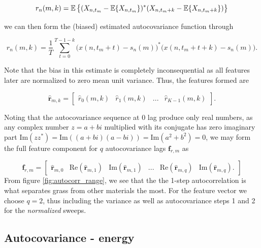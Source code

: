 \begin{equation}
	r_n(m, k) = \operatorname*{\mathbb{E}}\big\{(X_{n,t_m} - \operatorname*{\mathbb{E}}\{X_{n,t_m}\})^*(X_{n,t_m+k} - \operatorname*{\mathbb{E}}\{X_{n,t_m+k}\})\big\}
\end{equation}

\noindent
we can then form the (biased) estimated autocovariance function through

\begin{equation}
	\hat{r}_n(m, k) = \frac{1}{T}\sum_{t=0}^{T-1-k}\big(x(n,t_m+t) - s_n(m)\big)^*\big(x(n,t_m+t+k) - s_n(m)\big).
\end{equation}


Note that the bias in this estimate is completely inconsequential as all features later are normalized to zero mean unit variance.  Thus, the features formed are

\begin{equation}
	\hat{\mathbf{r}}_{m,k} = 
	\begin{bmatrix}
		\hat{r}_0(m,k) & \hat{r}_1(m,k) & ... & \hat{r}_{K-1}(m,k)
	\end{bmatrix}.
\end{equation}

Noting that the autocovariance sequence at 0 lag produce only real numbers, as any complex number $z = a + bi$ multiplied with its conjugate has zero imaginary part $\text{Im}(zz^*) = \text{Im}((a + bi)(a - bi)) = \text{Im}(a^2 + b^2) = 0$, we may form the full feature component for $q$ autocovariance lags $\mathbf{f}_{r,m}$ as

\begin{equation}
	\mathbf{f}_{r,m} = 
	\begin{bmatrix}
		\hat{\mathbf{r}}_{m,0}  & \text{Re}(\hat{\mathbf{r}}_{m,1} ) & \text{Im}(\hat{\mathbf{r}}_{m,1} ) & ... & \text{Re}(\hat{\mathbf{r}}_{m,q} ) & \text{Im}(\hat{\mathbf{r}}_{m,q} ).
	\end{bmatrix}
\end{equation}
From figure \ref{fig:autocorr_range}, we see that the the 1-step autocorrelation is what separates grass from other materials the most. For the feature vector we choose $q=2$, thus including the variance as well as autocovariance steps 1 and 2 for the \textit{normalized} sweeps.


\subsection{Autocovariance - energy}


